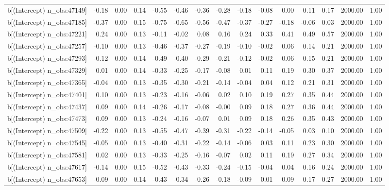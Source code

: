 \begin{table}[ht]
\begin{tabular}{rrrrrrrrrrrrrrr}
  b[(Intercept) n\_obs:47149] & -0.18 & 0.00 & 0.14 & -0.55 & -0.46 & -0.36 & -0.28 & -0.18 & -0.08 & 0.00 & 0.11 & 0.17 & 2000.00 & 1.00 \\ 
  b[(Intercept) n\_obs:47185] & -0.37 & 0.00 & 0.15 & -0.75 & -0.65 & -0.56 & -0.47 & -0.37 & -0.27 & -0.18 & -0.06 & 0.03 & 2000.00 & 1.00 \\ 
  b[(Intercept) n\_obs:47221] & 0.24 & 0.00 & 0.13 & -0.11 & -0.02 & 0.08 & 0.16 & 0.24 & 0.33 & 0.41 & 0.49 & 0.57 & 2000.00 & 1.00 \\ 
  b[(Intercept) n\_obs:47257] & -0.10 & 0.00 & 0.13 & -0.46 & -0.37 & -0.27 & -0.19 & -0.10 & -0.02 & 0.06 & 0.14 & 0.21 & 2000.00 & 1.00 \\ 
  b[(Intercept) n\_obs:47293] & -0.12 & 0.00 & 0.14 & -0.49 & -0.40 & -0.29 & -0.21 & -0.12 & -0.02 & 0.06 & 0.15 & 0.21 & 2000.00 & 1.00 \\ 
  b[(Intercept) n\_obs:47329] & 0.01 & 0.00 & 0.14 & -0.33 & -0.25 & -0.17 & -0.08 & 0.01 & 0.11 & 0.19 & 0.30 & 0.37 & 2000.00 & 1.00 \\ 
  b[(Intercept) n\_obs:47365] & -0.04 & 0.00 & 0.13 & -0.35 & -0.30 & -0.21 & -0.14 & -0.04 & 0.04 & 0.12 & 0.21 & 0.31 & 2000.00 & 1.00 \\ 
  b[(Intercept) n\_obs:47401] & 0.10 & 0.00 & 0.13 & -0.23 & -0.16 & -0.06 & 0.02 & 0.10 & 0.19 & 0.27 & 0.35 & 0.44 & 2000.00 & 1.00 \\ 
  b[(Intercept) n\_obs:47437] & 0.09 & 0.00 & 0.14 & -0.26 & -0.17 & -0.08 & -0.00 & 0.09 & 0.18 & 0.27 & 0.36 & 0.44 & 2000.00 & 1.00 \\ 
  b[(Intercept) n\_obs:47473] & 0.09 & 0.00 & 0.13 & -0.24 & -0.16 & -0.07 & 0.01 & 0.09 & 0.18 & 0.26 & 0.35 & 0.43 & 2000.00 & 1.00 \\ 
  b[(Intercept) n\_obs:47509] & -0.22 & 0.00 & 0.13 & -0.55 & -0.47 & -0.39 & -0.31 & -0.22 & -0.14 & -0.05 & 0.03 & 0.10 & 2000.00 & 1.00 \\ 
  b[(Intercept) n\_obs:47545] & -0.05 & 0.00 & 0.13 & -0.40 & -0.31 & -0.22 & -0.14 & -0.06 & 0.03 & 0.11 & 0.23 & 0.30 & 2000.00 & 1.00 \\ 
  b[(Intercept) n\_obs:47581] & 0.02 & 0.00 & 0.13 & -0.33 & -0.25 & -0.16 & -0.07 & 0.02 & 0.11 & 0.19 & 0.27 & 0.34 & 2000.00 & 1.00 \\ 
  b[(Intercept) n\_obs:47617] & -0.14 & 0.00 & 0.15 & -0.52 & -0.43 & -0.33 & -0.24 & -0.15 & -0.04 & 0.04 & 0.16 & 0.24 & 2000.00 & 1.00 \\ 
  b[(Intercept) n\_obs:47653] & -0.09 & 0.00 & 0.14 & -0.43 & -0.34 & -0.26 & -0.18 & -0.09 & 0.01 & 0.09 & 0.17 & 0.27 & 2000.00 & 1.00 \\ 

\end{tabular}
\end{table}
